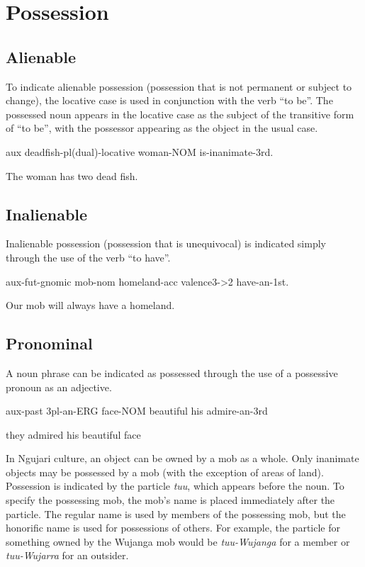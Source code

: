 \section{Possession}

\subsection{Alienable}

To indicate alienable possession (possession that is not permanent or subject to
change), the locative case is used in conjunction with the verb ``to be''. The
possessed noun appears in the locative case as the subject of the transitive
form of ``to be'', with the possessor appearing as the object in the usual case.

aux deadfish-pl(dual)-locative woman-NOM is-inanimate-3rd.

The woman has two dead fish.

\subsection{Inalienable}

Inalienable possession (possession that is unequivocal) is indicated simply
through the use of the verb ``to have''.

aux-fut-gnomic mob-nom homeland-acc valence3->2 have-an-1st.

Our mob will always have a homeland.

\subsection{Pronominal}

A noun phrase can be indicated as possessed through the use of a possessive
pronoun as an adjective.

aux-past 3pl-an-ERG face-NOM beautiful his admire-an-3rd

they admired his beautiful face

In Ngujari culture, an object can be owned by a mob as a whole. Only inanimate
objects may be possessed by a mob (with the exception of areas of land).
Possession is indicated by the particle \textit{tuu}, which appears before the noun. To
specify the possessing mob, the mob's name is placed immediately after the
particle. The regular name is used by members of the possessing mob, but the
honorific name is used for possessions of others. For example, the particle for
something owned by the Wujanga mob would be \textit{tuu-Wujanga} for a member or
\textit{tuu-Wujarra} for an outsider.

